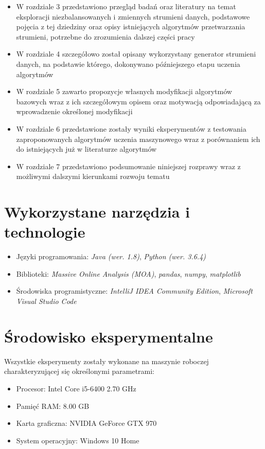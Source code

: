\begin{itemize}
    \item W rozdziale 3 przedstawiono przegląd badań oraz literatury na temat eksploracji niezbalansowanych i zmiennych strumieni danych, podstawowe pojęcia z tej dziedziny oraz opisy istniejących algorytmów przetwarzania strumieni, potrzebne do zrozumienia dalszej części pracy
    \item W rozdziale 4 szczegółowo został opisany wykorzystany generator strumieni danych, na podstawie którego, dokonywano późniejszego etapu uczenia algorytmów
    \item W rozdziale 5 zawarto propozycje własnych modyfikacji algorytmów bazowych wraz z ich szczegółowym opisem oraz motywacją odpowiadającą za wprowadzenie określonej modyfikacji
    \item W rozdziale 6 przedstawione zostały wyniki eksperymentów z testowania zaproponowanych algorytmów uczenia maszynowego wraz z porównaniem ich do istniejących już w literaturze algorytmów
    \item W rozdziale 7 przedstawiono podsumowanie niniejszej rozprawy wraz z możliwymi dalszymi kierunkami rozwoju tematu
\end{itemize}

\section{Wykorzystane narzędzia i technologie}

\begin{itemize}
    \item Języki programowania: \textit{Java (wer. 1.8)}, \textit{Python (wer. 3.6.4)}
    \item Biblioteki: \textit{Massive Online Analysis (MOA)}\cite{Article:MOA}, \textit{pandas}, \textit{numpy}, \textit{matplotlib}
    \item Środowiska programistyczne: \textit{IntelliJ IDEA Community Edition}, \textit{Microsoft Visual Studio Code}
\end{itemize}

\section{Środowisko eksperymentalne}

\noindent Wszystkie eksperymenty zostały wykonane na maszynie roboczej charakteryzującej się określonymi parametrami:

\begin{itemize}
    \item Procesor: Intel Core i5-6400 2.70 GHz
    \item Pamięć RAM: 8.00 GB
    \item Karta graficzna: NVIDIA GeForce GTX 970
    \item System operacyjny: Windows 10 Home
\end{itemize}